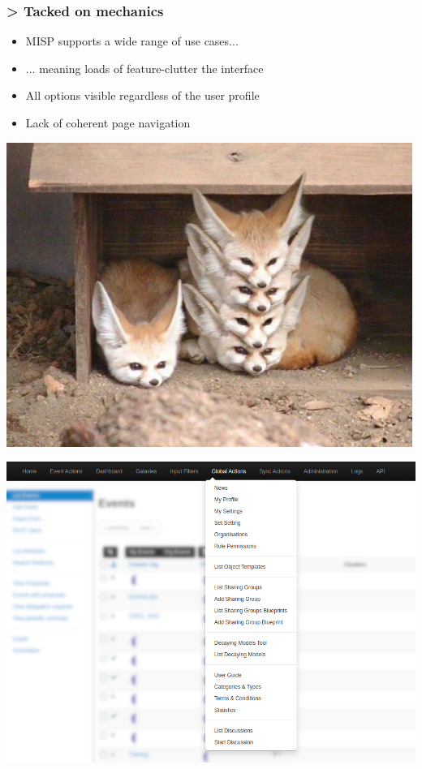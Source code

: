 \begin{frame}[fragile]
    \frametitle{> Tacked on mechanics}
    \vspace{1em}
    \begin{minipage}{0.7\textwidth}
        \begin{itemize}
            \item MISP supports a wide range of use cases...
            \item ... meaning loads of feature-clutter the interface
            \item All options visible regardless of the user profile
            \item Lack of coherent page navigation
        \end{itemize}
    \end{minipage}%
    \begin{minipage}{0.3\textwidth}
        \begin{center}
            \;\;\includegraphics[width=0.8\linewidth]{pictures/fennec-stack.png}
        \end{center}
    \end{minipage}
    \begin{center}
        \includegraphics[width=0.55\linewidth]{pictures/confusing-navigation.png}
    \end{center}
\end{frame}

